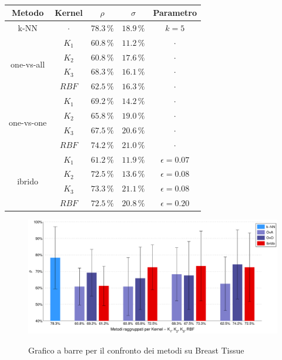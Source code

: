 \paragraph{}
\begin{center}
\begin{tabular}{ |c|c|c|c|c| } 
\hline
Metodo & Kernel & $\rho$ & $\sigma$ & Parametro \\
\hline

\multirow{1}{*}{k-NN}
& $\cdot$ & $78.3 \,\%$ & $18.9 \,\%$ & $k = 5$ \\ 
\hline

\multirow{4}{*}{one-vs-all}
& $K_1$ & $60.8 \,\%$ & $11.2 \,\%$ & $\cdot$ \\ 
& $K_2$ & $60.8 \,\%$ & $17.6 \,\%$ & $\cdot$ \\ 
& $K_3$ & $68.3 \,\%$ & $16.1 \,\%$ & $\cdot$ \\ 
& $RBF$ & $62.5 \,\%$ & $16.3 \,\%$ & $\cdot$ \\ 
\hline

\multirow{4}{*}{one-vs-one}
& $K_1$ & $69.2 \,\%$ & $14.2 \,\%$ & $\cdot$ \\ 
& $K_2$ & $65.8 \,\%$ & $19.0 \,\%$ & $\cdot$ \\ 
& $K_3$ & $67.5 \,\%$ & $20.6 \,\%$ & $\cdot$ \\ 
& $RBF$ & $74.2 \,\%$ & $21.0 \,\%$ & $\cdot$ \\ 
\hline

\multirow{4}{*}{ibrido}
& $K_1$ & $61.2 \,\%$ & $11.9 \,\%$ & $\epsilon = 0.07$ \\ 
& $K_2$ & $72.5 \,\%$ & $13.6 \,\%$ & $\epsilon = 0.08$ \\ 
& $K_3$ & $73.3 \,\%$ & $21.1 \,\%$ & $\epsilon = 0.08$ \\ 
& $RBF$ & $72.5 \,\%$ & $20.8 \,\%$ & $\epsilon = 0.20$ \\ 
\hline

\end{tabular}
\end{center}


\begin{figure}[H] %
 	\centering	
	
	\fboxsep=0mm%
	\fboxrule=1mm%

	 {
		\includegraphics[width=\textwidth]{img/BarBreastTissue.eps}
	}	
	\caption{Grafico a barre per il confronto dei metodi su Breast Tissue}
\end{figure}

